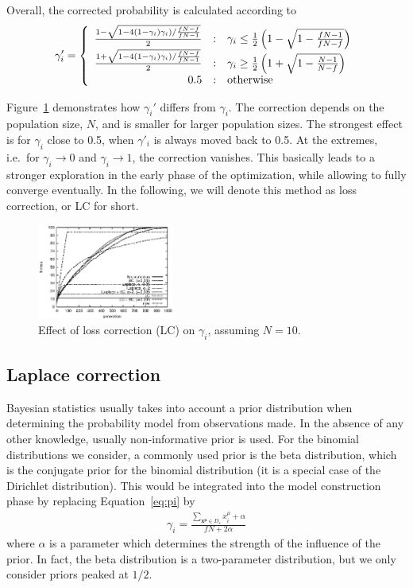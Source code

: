 \documentclass{acm_proc_article-sp}
\newcommand{\Np}{N}
\newcommand{\p}{\gamma}
\begin{document}
Overall, the corrected probability is calculated according to 
\begin{eqnarray}
\p'_i=\left\{\begin{array}{r@{\quad:\quad}l}
  \frac{1-\sqrt{1-4(1-\p_i)\p_i)/\frac{f\Np-f}{f\Np-1}}}{2} & \p_i\leq \frac{1}{2}\left(1-\sqrt{1-\frac{f\Np-1}{f\Np-f}}\right)\\
  \frac{1+\sqrt{1-4(1-\p_i)\p_i)/\frac{f\Np-f}{f\Np-1}}}{2} & \p_i\geq \frac{1}{2}\left(1+\sqrt{1-\frac{\Np-1}{\Np-f}}\right)\\
 0.5 & \mbox{otherwise}
\end{array} \right.
\end{eqnarray}

Figure~\ref{fig:correction} demonstrates how $\p_i'$ differs from $\p_i$. 
The correction 
depends on the population size, $\Np$, and is smaller for larger population sizes.
The strongest effect is for $\p_i$ close to 0.5, when $\p'_i$ is always moved back
to 0.5. At the extremes, i.e.\  for $\p_i\rightarrow 0$ and $\p_i\rightarrow 1$, the 
correction vanishes. This basically leads to a stronger exploration in the early phase
of the optimization, while allowing to fully converge eventually. 
In the following, we will denote this method as loss correction, or LC for short.

\begin{figure}
\centerline{
\includegraphics[width=0.4\textwidth]{graph_leading1169910391/graph_leading000_fitness.eps}}
\caption{Effect of loss correction (LC) on $\p_i$, assuming $\Np=10$.\label{fig:correction}}
\end{figure}

\subsection{Laplace correction}
\label{sec:laplace}

Bayesian statistics usually takes into account a prior distribution when
determining the probability model from observations made. In the absence of
any other knowledge, usually non-informative prior is used. For the binomial
distributions we consider, a commonly used prior is the beta distribution,
which is the conjugate prior for the binomial distribution (it is a special
case of the Dirichlet distribution). This would be integrated into the model
construction phase by replacing Equation~\ref{eq:pi} by
\begin{eqnarray}
\p_i=\frac{\sum_{\mathbf{x^\mu}\in D_s} x_i^\mu + \alpha}{f\Np + 2\alpha}\label{eq:laplace}
\end{eqnarray}
where $\alpha$ is a parameter which determines the strength of the
influence of the prior. In fact, the beta distribution is a
two-parameter distribution, but we only consider priors peaked at
$1/2$. 
\end{document}
